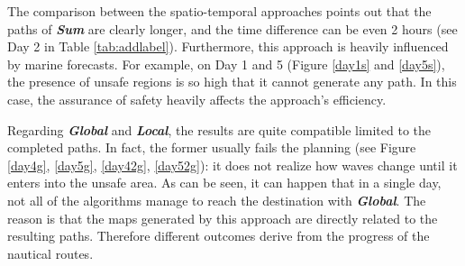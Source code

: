 The comparison between the spatio-temporal approaches points out that the paths of \textbf{\textit{Sum}} are clearly longer, and the time difference can be even 2 hours (see Day 2 in Table \ref{tab:addlabel}). Furthermore, this approach is heavily influenced by marine forecasts. For example, on Day 1 and 5 (Figure \ref{day1s} and \ref{day5s}), the presence of unsafe regions is so high that it cannot generate any path. In this case, the assurance of safety heavily affects the approach's efficiency.

Regarding \textbf{\textit{Global}} and \textbf{\textit{Local}}, the results are quite compatible limited to the completed paths. In fact, the former usually fails the planning (see Figure \ref{day4g}, \ref{day5g}, \ref{day42g}, \ref{day52g}): it does not realize how waves change until it enters into the unsafe area.
As can be seen, it can happen that in a single day, not all of the algorithms manage to reach the destination with \textbf{\textit{Global}}. The reason is that the maps generated by this approach are directly related to the resulting paths. Therefore different outcomes derive from the progress of the nautical routes.
